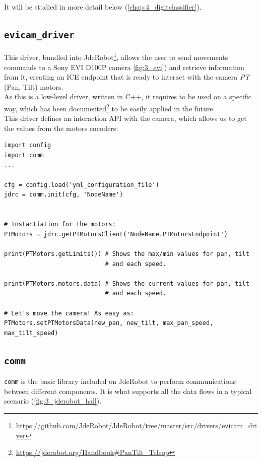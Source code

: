 		It will be studied in more detail below (\autoref{chap:4_digitclassifier}).
	
	
	\subsection{\texttt{evicam\_driver}}
	\label{sec:3_evicam_driver}
	This driver, bundled into JdeRobot\footnote{\url{https://github.com/JdeRobot/JdeRobot/tree/master/src/drivers/evicam\_driver}}, allows the user to send movements commands to a Sony EVI D100P camera \autoref{fig:3_evi}) and retrieve information from it, creating an ICE endpoint that is ready to interact with the camera \emph{PT} (Pan, Tilt) motors.\\
	
	As this is a low-level driver, written in C++, it requires to be used on a specific way, which has been documented\footnote{\url{https://jderobot.org/Handbook\#PanTilt_Teleop}} to be easily applied in the future.\\
	
	This driver defines an interaction API with the camera, which allows us to get the values from the motors encoders:
	\begin{lstlisting}
import config
import comm
...

cfg = config.load('yml_configuration_file')
jdrc = comm.init(cfg, 'NodeName')


# Instantiation for the motors:
PTMotors = jdrc.getPTMotorsClient('NodeName.PTMotorsEndpoint')

print(PTMotors.getLimits()) # Shows the max/min values for pan, tilt 
                            # and each speed.

print(PTMotors.motors.data) # Shows the current values for pan, tilt
                            # and each speed.

# Let's move the camera! As easy as:
PTMotors.setPTMotorsData(new_pan, new_tilt, max_pan_speed, max_tilt_speed)
	\end{lstlisting}
	
	\subsection{\texttt{comm}}
		\label{sec:3_comm}
		\texttt{comm} is the basic library included on JdeRobot to perform communications between different components. It is what supports all the data flows in a typical scenario (\autoref{fig:3_jderobot_hal}).\\
		
